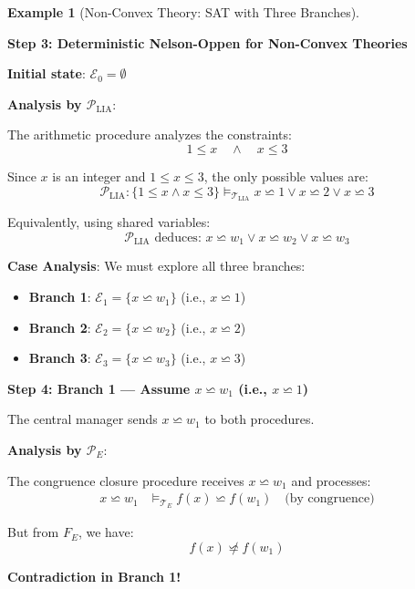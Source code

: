 \documentclass[11pt,a4paper]{article}
\theoremstyle{definition}
\newtheorem{example}{Example}[section]
\theoremstyle{plain}
\theoremstyle{remark}
\begin{document}
\begin{example}[Non-Convex Theory: SAT with Three Branches]
\begin{tcolorbox}[colback=green!5!white,colframe=green!75!black,title=\textbf{Example 4: Non-Convex $\mathcal{T}_{\text{LIA}}$ — One SAT Branch Suffices},breakable]
\textbf{Step 3: Deterministic Nelson-Oppen for Non-Convex Theories}

\textbf{Initial state}: $\mathcal{E}_0 = \emptyset$

\vspace{0.3em}

\textbf{Analysis by $\mathcal{P}_{\text{LIA}}$}:

The arithmetic procedure analyzes the constraints:
\[
1 \leq x \quad \wedge \quad x \leq 3
\]

Since $x$ is an integer and $1 \leq x \leq 3$, the only possible values are:
\[
\mathcal{P}_{\text{LIA}}: \{1 \leq x \wedge x \leq 3\} \models_{\mathcal{T}_{\text{LIA}}} x \backsimeq 1 \vee x \backsimeq 2 \vee x \backsimeq 3
\]

Equivalently, using shared variables:
\[
\mathcal{P}_{\text{LIA}} \text{ deduces: } x \backsimeq w_1 \vee x \backsimeq w_2 \vee x \backsimeq w_3
\]

\vspace{0.3em}

\textbf{Case Analysis}: We must explore all three branches:

\begin{itemize}
    \item \textbf{Branch 1}: $\mathcal{E}_1 = \{x \backsimeq w_1\}$ (i.e., $x \backsimeq 1$)
    \item \textbf{Branch 2}: $\mathcal{E}_2 = \{x \backsimeq w_2\}$ (i.e., $x \backsimeq 2$)
    \item \textbf{Branch 3}: $\mathcal{E}_3 = \{x \backsimeq w_3\}$ (i.e., $x \backsimeq 3$)
\end{itemize}

\vspace{0.5em}

\textbf{Step 4: Branch 1 — Assume $x \backsimeq w_1$ (i.e., $x \backsimeq 1$)}

The central manager sends $x \backsimeq w_1$ to both procedures.

\textbf{Analysis by $\mathcal{P}_E$}:

The congruence closure procedure receives $x \backsimeq w_1$ and processes:
\begin{align*}
x \backsimeq w_1 &\models_{\mathcal{T}_E} f(x) \backsimeq f(w_1) \quad \text{(by congruence)}
\end{align*}

But from $F_E$, we have:
\[
f(x) \not\backsimeq f(w_1)
\]

\textbf{Contradiction in Branch 1!}


\end{tcolorbox}
\end{example}
\end{document}
